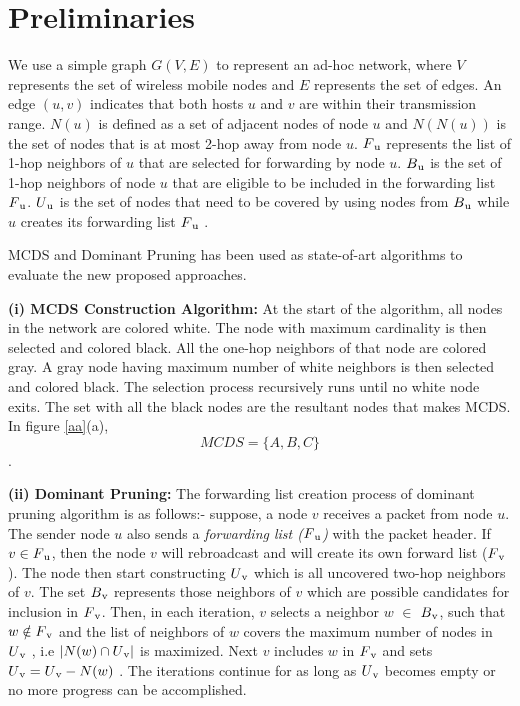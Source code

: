 \section{Preliminaries}
\label{Preliminaries}

We use a simple graph $G(V,E)$ to represent an ad-hoc network, where $V$ represents the set of wireless mobile nodes and $E$ represents the set of edges. An edge $(u,v)$ indicates that both hosts $u$ and $v$ are within their transmission range. $N(u)$ is defined as a set of adjacent nodes of node $u$ and $N(N(u))$ is the set of nodes that is at most 2-hop away from node $u$. $F\textsubscript{u}$ represents the list of 1-hop neighbors of $u$ that are selected for forwarding by node $u$. $B\textsubscript{u}$ is the set of 1-hop neighbors of node $u$ that are eligible to be included in the forwarding list $F\textsubscript{u}$. $U\textsubscript{u}$ is the set of nodes that need to be covered by using nodes from $B\textsubscript{u}$ while $u$ creates its forwarding list $F\textsubscript{u}$ . 

MCDS \cite{guha1998approximation} and Dominant Pruning \cite{lim2001flooding} has been used as state-of-art algorithms to evaluate the new proposed approaches. 

\textbf{(i) MCDS Construction Algorithm:} At the start of the algorithm, all nodes in the network are colored white. The node with maximum cardinality is then selected and colored black. All the one-hop neighbors of that node are colored gray. A gray node having maximum number of white neighbors is then selected and colored black. The selection process recursively runs until no white node exits. The set with all the black nodes are the resultant nodes that makes MCDS. In figure \ref{aa}(a), $$MCDS = \{A,B,C\}$$.
 
\textbf{(ii) Dominant Pruning:} The forwarding list creation process of dominant pruning algorithm is as follows:- suppose, a node $v$ receives a packet from node $u$. The sender node $u$ also sends a \textit{forwarding list ($F\textsubscript{u}$)}  with the packet header. If  $v \in F\textsubscript{u}$, then the node $v$ will rebroadcast and will create its own forward list ($F\textsubscript{v}$). The node then start constructing $U\textsubscript{v}$ which is all uncovered two-hop neighbors of $v$. The set $B\textsubscript{v}$ represents those neighbors of $v$ which are possible candidates for inclusion in $F\textsubscript{v}$. Then, in each iteration, $v$ selects a neighbor $w$ $\in$ $B\textsubscript{v}$, such that $w \notin F\textsubscript{v}$ and the list of neighbors of $w$ covers the maximum number of nodes in $U\textsubscript{v}$ , i.e $|N(w)\cap U\textsubscript{v}|$ is maximized. Next $v$ includes $w$ in  $F\textsubscript{v}$ and sets $U\textsubscript{v} =U\textsubscript{v} - N(w)$ . The iterations continue for as long as $U\textsubscript{v}$ becomes empty or no more progress can be accomplished. 
 